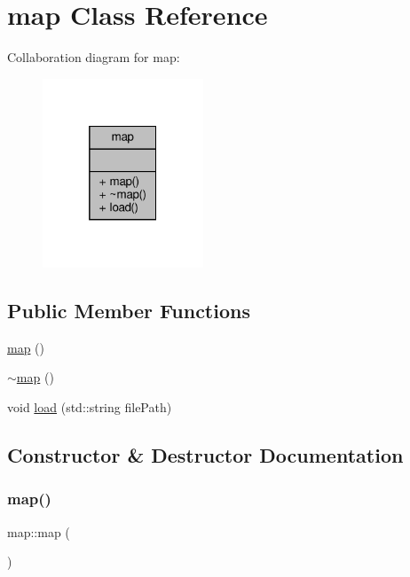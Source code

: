 \hypertarget{classmap}{}\section{map Class Reference}
\label{classmap}


Collaboration diagram for map\+:
\nopagebreak
\begin{figure}[H]
\begin{center}
\leavevmode
\includegraphics[width=136pt]{classmap__coll__graph}
\end{center}
\end{figure}
\subsection*{Public Member Functions}
\begin{DoxyCompactItemize}
\item 
\hyperlink{classmap_abedfe6722ad83929739afd899c88fea4}{map} ()
\item 
\hyperlink{classmap_a0cc22df7b44f7835fa10ed241848b041}{$\sim$map} ()
\item 
void \hyperlink{classmap_a3edebf1c088adbb83a2e412accbe998e}{load} (std\+::string file\+Path)
\end{DoxyCompactItemize}


\subsection{Constructor \& Destructor Documentation}
\mbox{\label{classmap_abedfe6722ad83929739afd899c88fea4}} 
\subsubsection{\texorpdfstring{map()}{map()}}
{\footnotesize\ttfamily map\+::map (\begin{DoxyParamCaption}{ }\end{DoxyParamCaption})\hspace{0.3cm}{\ttfamily [inline]}}

